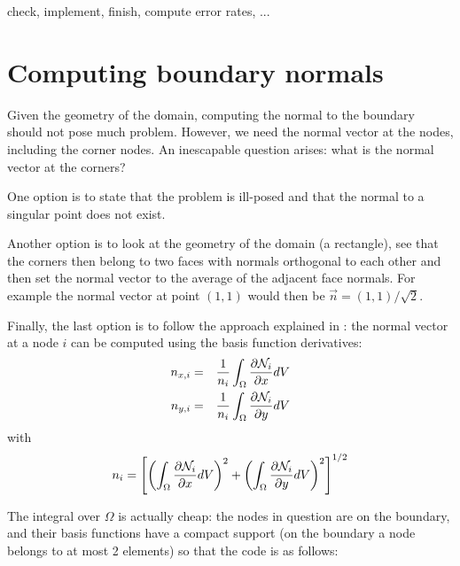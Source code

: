 {\color{red} check, implement, finish, compute error rates, ...}





\section*{Computing boundary normals}

Given the geometry of the domain, computing the normal to the boundary 
should not pose much problem. However, we need the normal vector at the nodes,
including the corner nodes. An inescapable question arises: 
what is the normal vector at the corners?

One option is to state that the problem is ill-posed and that the normal to a
singular point does not exist.

Another option is to look at the geometry of the domain (a rectangle), see that 
the corners then belong to two faces with normals orthogonal to each other 
and then set the normal vector to the average of the adjacent face normals.
For example the normal vector at point $(1,1)$ would then be $\vec{n}=(1,1)/\sqrt{2}$.

Finally, the last option is to follow the approach 
explained in \textcite{ensg82}: 
the normal vector at a node $i$ can be computed using the basis function derivatives:
\begin{eqnarray}
n_{x,i} &=& \frac{1}{n_i}\int_\Omega \frac{\partial {\mathcal{N}}_i}{\partial x} dV \nonumber\\
n_{y,i} &=& \frac{1}{n_i}\int_\Omega \frac{\partial {\mathcal{N}}_i}{\partial y} dV \nonumber
\end{eqnarray}
with 
\[
n_i = \left[
\left(\int_\Omega \frac{\partial {\mathcal{N}}_i}{\partial x} dV\right)^2 +
\left(\int_\Omega \frac{\partial {\mathcal{N}}_i}{\partial y} dV\right)^2 
\right]^{1/2}
\]

The integral over $\Omega$ is actually cheap: the nodes in question are on the boundary, 
and their basis functions have a compact support (on the boundary a node belongs to at 
most 2 elements) so that the code is as follows:

